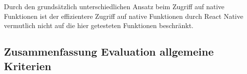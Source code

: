Durch den grundsätzlich unterschiedlichen Ansatz beim Zugriff auf native Funktionen ist der effizientere Zugriff auf native Funktionen durch React Native vermutlich nicht auf die hier getesteten Funktionen beschränkt.


\subsection{Zusammenfassung Evaluation allgemeine Kriterien}
